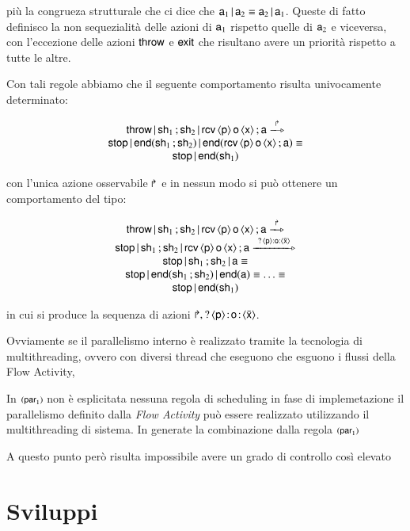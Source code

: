 più la congrueza strutturale che ci dice che ${\sf a}_1 \,|\, {\sf a}_2  \equiv {\sf a}_2
\,|\, {\sf a}_1$. Queste di fatto definisco la non sequezialità delle azioni di
${\sf a}_1$ rispetto quelle di ${\sf a}_2$ e viceversa, con l'eccezione delle azioni
${\sf throw}$ e ${\sf exit}$ che risultano avere un priorità rispetto a tutte le altre.

Con tali regole abbiamo che il seguente comportamento risulta univocamente
determinato:

$$
\begin{array}{c}
\xthr \xpar \xsla_1 \xsucc \xsla_2 \xpar \xrec{\arr{\xp}}{\xo}{\arr{\xx}}
\xsucc \xs \bpeltsarrow{\xthrl}\\
\xstop \xpar \xhalt{\xsla_1 \xsucc \xsla_2} \xpar
   \xhalt{\xrec{\arr{\xp}}{\xo}{\arr{\xx}} \xsucc \xs } \xequiv \\
   \xstop \xpar \xhalt{\xsla_1}
\end{array}
$$

con l'unica azione osservabile $\Rsh$ e in nessun modo si può ottenere un
comportamento del tipo:

$$
\begin{array}{c}
\xthr \xpar \xsla_1 \xsucc \xsla_2 \xpar \xrec{\arr{\xp}}{\xo}{\arr{\xx}}
\xsucc \xs \bpeltsarrow{\xthrl} \\
\xstop \xpar \xsla_1 \xsucc \xsla_2 \xpar 
\xrec{\arr{\xp}}{\xo}{\arr{\xx}} \xsucc \xs
\bpeltsarrow{\xrecl{\arr{\xp}\,}{\,\xo\,}{\,\arr{\bar{\xx}}}}\\

\xstop \xpar \xsla_1 \xsucc \xsla_2 \xpar 
\xs \xequiv \\

\xstop \xpar \xhalt{\xsla_1 \xsucc \xsla_2} \xpar
   \xhalt{ \xs } \xequiv \ldots \xequiv 
\\
\xstop \xpar \xhalt{\xsla_1}

\end{array}
$$

in cui si produce la sequenza di azioni $\Rsh ,
?\,\langle {\sf p} \rangle\! : \! {\sf o}\! : \! \langle \bar{{\sf x}} \rangle$.

Ovviamente se il parallelismo interno è realizzato tramite la tecnologia di
multithreading, ovvero con diversi thread che eseguono che esguono i flussi
della Flow Activity, 

In $\textrm{\footnotesize{(${\sf par}_1$)}}$ non è esplicitata nessuna regola di
scheduling in fase di implemetazione il parallelismo definito dalla \emph{Flow
Activity} può essere realizzato utilizzando il multithreading di sistema. In
generate la combinazione dalla regola $\textrm{\footnotesize{(${\sf par}_1$)}}$  

A questo punto
però risulta impossibile avere un grado di controllo così elevato



\section{Sviluppi}



